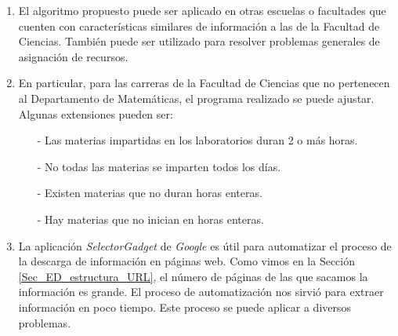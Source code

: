 \begin{enumerate}
\item El algoritmo propuesto puede ser aplicado en otras escuelas o facultades que cuenten con características similares de información a las de la Facultad de Ciencias. También puede ser utilizado para resolver problemas generales de asignación de recursos.

\item En particular, para las carreras de la Facultad de Ciencias que no pertenecen al Departamento de Matemáticas, el programa realizado se puede ajustar. Algunas extensiones pueden ser: %

%
%
%

\begin{itemize}
\item[-] Las materias impartidas en los laboratorios duran 2 o más horas.

\item[-] No todas las materias se imparten todos los días.

\item[-] Existen materias que no duran horas enteras.

\item[-] Hay materias que no inician en horas enteras.
\end{itemize}

\item La aplicación \textit{SelectorGadget} de \textit{Google} es útil para automatizar el proceso de la descarga de información en páginas web. Como vimos en la Sección \ref{Sec_ED_estructura_URL}, el número de páginas de las que sacamos la información es grande. El proceso de automatización nos sirvió para extraer información en poco tiempo. Este proceso se puede aplicar a diversos problemas. %

\end{enumerate}

